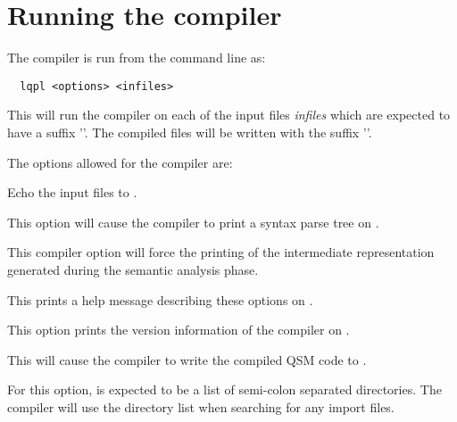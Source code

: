 \section{Running the \lqpl{} compiler}\label{appsec:runningthecompiler}
The compiler is run from the command line as:
\begin{Verbatim}
  lqpl <options> <infiles>
\end{Verbatim}

This will run the compiler on each of the input files \emph{infiles} which 
are expected to have a suffix ''. The compiled files will be 
written with the suffix ''.

The options allowed for the compiler are:
\begin{description}
\item{} Echo the input files to 
 .
\item{} This option will cause the 
compiler to print a syntax parse tree on .
\item{} This compiler option
will force the printing of the intermediate representation generated
during the semantic analysis phase.
\item{} This prints a 
help message describing these
options on .
\item{} This option prints the version information of the 
compiler on .
\item{} This will
cause the compiler to write the compiled QSM code to 
.
\item{} For this option,
 is expected to be a list of semi-colon separated
directories. The compiler will use the directory list when searching for
any  import files.
\end{description}


